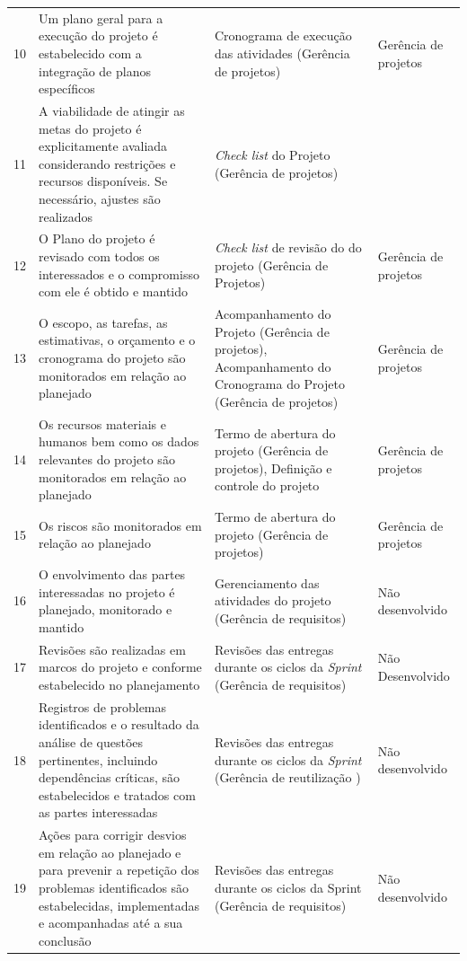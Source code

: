 \documentclass{acm_proc_article-sp}
\begin{document}
\begin{appendices}
\begin{table}[h]
\begin{tabular}{|p{10mm}|p{60mm}|p{60mm}|p{25mm}|}
10 & Um plano geral para a execução do projeto é estabelecido com a integração de planos específicos & Cronograma de execução das atividades (Gerência de projetos) & Gerência de projetos\\
11 & A viabilidade de atingir as metas do projeto é explicitamente avaliada considerando restrições e recursos disponíveis. Se necessário, ajustes são realizados & \textit{Check list} do Projeto (Gerência de projetos) & \\
12 & O Plano do projeto é revisado com todos os interessados e o compromisso com ele é obtido e mantido &  \textit{Check list} de revisão do do projeto (Gerência de Projetos)& Gerência de projetos\\
13 & O escopo, as tarefas, as estimativas, o orçamento e o cronograma do projeto são monitorados em relação ao planejado & 
Acompanhamento do Projeto (Gerência de projetos), Acompanhamento do Cronograma do Projeto (Gerência de projetos) & Gerência de projetos\\
14 & Os recursos materiais e humanos bem como os dados relevantes do projeto são monitorados em relação ao planejado & 
Termo de abertura do projeto (Gerência de projetos), Definição e controle do projeto & Gerência de projetos \\
15 & Os riscos são monitorados em relação ao planejado & Termo de abertura do projeto (Gerência de projetos) &  Gerência de projetos\\
16 & O envolvimento das partes interessadas no projeto é planejado, monitorado e mantido & Gerenciamento das atividades do projeto (Gerência de requisitos)  & Não desenvolvido \\
17 & Revisões são realizadas em marcos do projeto e conforme estabelecido no planejamento & Revisões das entregas durante os ciclos da \textit{Sprint} (Gerência de requisitos) & Não Desenvolvido \\
18 & Registros de problemas identificados e o resultado da análise de questões pertinentes, incluindo dependências críticas, são
estabelecidos e tratados com as partes interessadas & Revisões das entregas durante os ciclos da \textit{Sprint} (Gerência de reutilização ) & Não desenvolvido \\
19 & Ações para corrigir desvios em relação ao planejado e para prevenir a repetição dos problemas identificados são estabelecidas, implementadas e acompanhadas até a sua conclusão & Revisões das entregas durante os ciclos da Sprint (Gerência de requisitos) & Não desenvolvido \\


\end{tabular}
\end{table}
\end{appendices}
\end{document}
